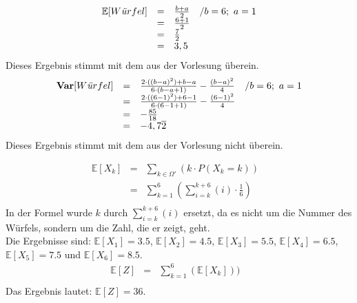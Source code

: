 \documentclass[twoside]{article}
\begin{document}
\sss
\begin{equation*}
    \begin{array}{rlll}
        \mathbb{E}[W$\textit{ü}$rfel]&=    &\frac{b + a}{2}&/b=6;~a=1\\
            &=    &\frac{6 + 1}{2}&\\
            &=    &\frac{7}{2}&\\
            &=    &3,5&\\
    \end{array}
\end{equation*}
Dieses Ergebnis stimmt mit dem aus der Vorlesung überein.
\begin{equation*}
    \begin{array}{rlll}
        \textbf{Var}[W$\textit{ü}$rfel]&=    &\frac{2 \cdot ((b-a)^2)+b-a}{6\cdot(b - a + 1)} - \frac{(b-a)^2}{4}&/b=6;~a=1\\
            &=    &\frac{2 \cdot ((6-1)^2)+6-1}{6\cdot(6 - 1 + 1)} - \frac{(6-1)^2}{4}&\\
            &=    &-\frac{85}{18}&\\
            &=    &-4,7\overline{2}&\\
    \end{array}
\end{equation*}
Dieses Ergebnis stimmt mit dem aus der Vorlesung nicht überein.

\sss

\begin{equation*}
    \begin{array}{rlll}
        \mathbb{E}[X_k]&=    &\sum_{k \in \Omega'}(k\cdot P(X_k = k))&\\
            &=    &\sum_{k=1}^{6}(\sum_{i=k}^{k+6}(i) \cdot \frac{1}{6})&\\
    \end{array}
\end{equation*}
In der Formel wurde $k$ durch $\sum_{i=k}^{k+6}(i)$ ersetzt, da es nicht um die Nummer des Würfels, sondern um die Zahl, die er zeigt, geht.
\\
Die Ergebnisse sind: $\mathbb{E}[X_1]=3.5$, $\mathbb{E}[X_2]=4.5$, $\mathbb{E}[X_3]=5.5$, $\mathbb{E}[X_4]=6.5$, $\mathbb{E}[X_5]=7.5$ und $\mathbb{E}[X_6]=8.5$.
\begin{equation*}
    \begin{array}{rlll}
        \mathbb{E}[Z]&=    &\sum_{k = 1}^{6}(\mathbb{E}[X_k]))&\\
    \end{array}
\end{equation*}
Das Ergebnis lautet: $\mathbb{E}[Z] = 36$.
\end{document}
